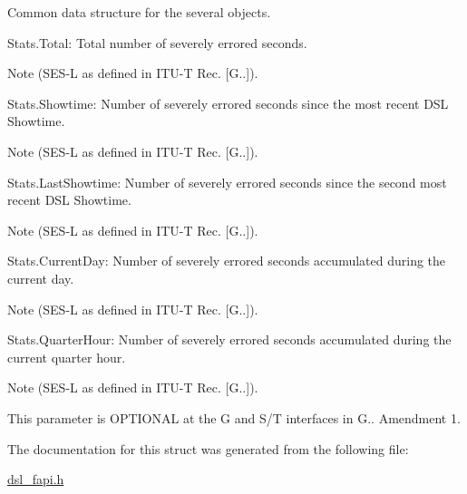 Common data structure for the several objects.
\begin{DoxyItemize}
\item Stats.\-Total\-: Total number of severely errored seconds. \begin{DoxyNote}{Note}
(S\-E\-S-\/\-L as defined in I\-T\-U-\/\-T Rec. \mbox{[}G..\mbox{]}).
\end{DoxyNote}

\item Stats.\-Showtime\-: Number of severely errored seconds since the most recent D\-S\-L Showtime. \begin{DoxyNote}{Note}
(S\-E\-S-\/\-L as defined in I\-T\-U-\/\-T Rec. \mbox{[}G..\mbox{]}).
\end{DoxyNote}

\item Stats.\-Last\-Showtime\-: Number of severely errored seconds since the second most recent D\-S\-L Showtime. \begin{DoxyNote}{Note}
(S\-E\-S-\/\-L as defined in I\-T\-U-\/\-T Rec. \mbox{[}G..\mbox{]}).
\end{DoxyNote}

\item Stats.\-Current\-Day\-: Number of severely errored seconds accumulated during the current day. \begin{DoxyNote}{Note}
(S\-E\-S-\/\-L as defined in I\-T\-U-\/\-T Rec. \mbox{[}G..\mbox{]}).
\end{DoxyNote}

\item Stats.\-Quarter\-Hour\-: Number of severely errored seconds accumulated during the current quarter hour. \begin{DoxyNote}{Note}
(S\-E\-S-\/\-L as defined in I\-T\-U-\/\-T Rec. \mbox{[}G..\mbox{]}). 

This parameter is O\-P\-T\-I\-O\-N\-A\-L at the G and S/\-T interfaces in G.. Amendment 1. 
\end{DoxyNote}

\end{DoxyItemize}

The documentation for this struct was generated from the following file\-:\begin{DoxyCompactItemize}
\item 
\hyperlink{dsl__fapi_8h}{dsl\-\_\-fapi.\-h}\end{DoxyCompactItemize}
